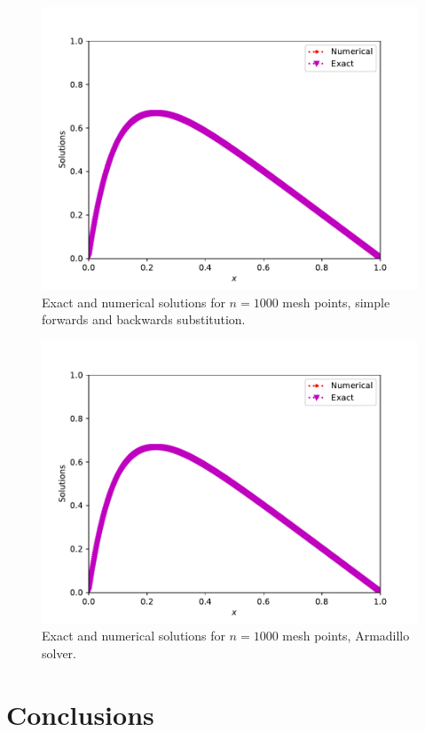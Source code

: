 \documentclass[10pt,showpacs,preprintnumbers,footinbib,amsmath,amssymb,aps,prl,twocolumn,groupedaddress,superscriptaddress,showkeys]{revtex4-1}
\begin{document}
\begin{figure}[hbtp]
\includegraphics[scale=0.4]{../Output/TridiagonalSimple_out3.pdf}
\caption{Exact and numerical solutions for $n=1000$ mesh points, simple forwards and backwards substitution.}
\label{fig:TridiagonalSimple_out3}
\end{figure}

\begin{figure}[hbtp]
\includegraphics[scale=0.4]{../Output/TridiagonalArma_out3.pdf}
\caption{Exact and numerical solutions for $n=1000$ mesh points, Armadillo solver.}
\label{fig:TridiagonalArma_out3}
\end{figure}


\section{Conclusions}


\begin{thebibliography}{99}
\end{thebibliography}
\end{document}
